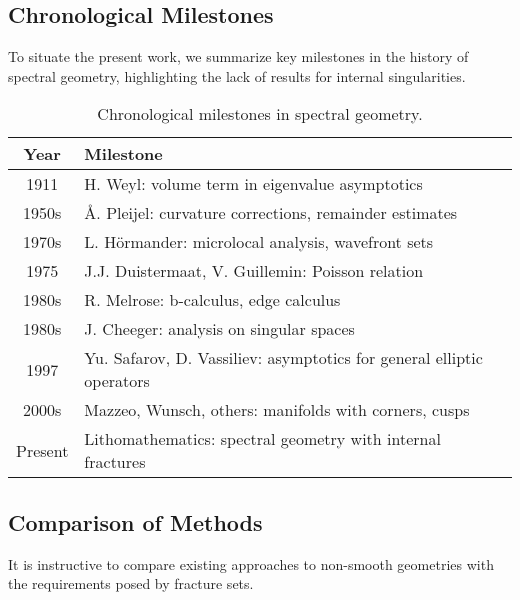 \subsection{Chronological Milestones}

To situate the present work, we summarize key milestones in the history 
of spectral geometry, highlighting the lack of results for internal singularities.

\begin{table}[h]
\centering
\begin{tabular}{|c|p{7cm}|}
\hline
\textbf{Year} & \textbf{Milestone} \\
\hline
1911 & H. Weyl: volume term in eigenvalue asymptotics \\
1950s & Å. Pleijel: curvature corrections, remainder estimates \\
1970s & L. Hörmander: microlocal analysis, wavefront sets \\
1975 & J.J. Duistermaat, V. Guillemin: Poisson relation \\
1980s & R. Melrose: b-calculus, edge calculus \\
1980s & J. Cheeger: analysis on singular spaces \\
1997 & Yu. Safarov, D. Vassiliev: asymptotics for general elliptic operators \\
2000s & Mazzeo, Wunsch, others: manifolds with corners, cusps \\
Present & Lithomathematics: spectral geometry with internal fractures \\
\hline
\end{tabular}
\caption{Chronological milestones in spectral geometry.}
\end{table}

\subsection{Comparison of Methods}

It is instructive to compare existing approaches to non-smooth geometries 
with the requirements posed by fracture sets.

